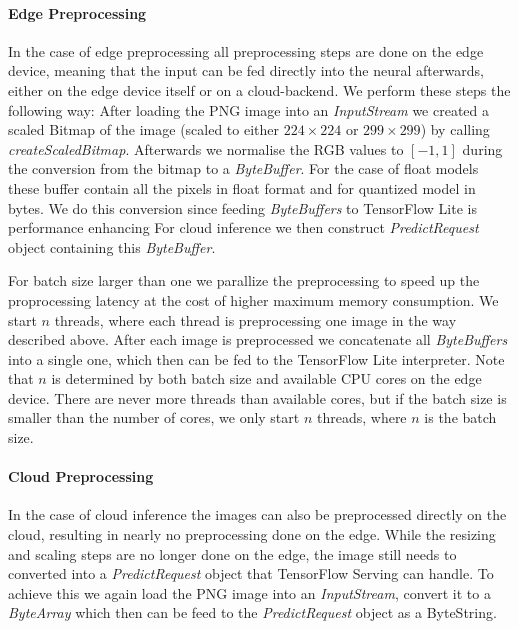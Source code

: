\paragraph{Edge Preprocessing}
In the case of edge preprocessing all preprocessing steps are done on the edge device, meaning that the input can be fed directly into the neural afterwards, either on the edge device itself or on a cloud-backend.
We perform these steps the following way: After loading the PNG image into an \emph{InputStream} we created a scaled Bitmap of the image (scaled to either $224\times224$ or $299\times299$) by calling \emph{createScaledBitmap}. 
Afterwards we normalise the RGB values to $[-1,1]$ during the conversion from the bitmap to a \emph{ByteBuffer}. 
For the case of float models these buffer contain all the pixels in float format and for quantized model in bytes.
We do this conversion since feeding \emph{ByteBuffers} to TensorFlow Lite is performance enhancing %
For cloud inference we then construct \emph{PredictRequest} object containing this \emph{ByteBuffer}.

For batch size larger than one we parallize the preprocessing to speed up the proprocessing latency at the cost of higher maximum memory consumption. We start $n$ threads, where each thread is preprocessing one image in the way described above. After each image is preprocessed we concatenate all \emph{ByteBuffers} into a single one, which then can be fed to the TensorFlow Lite interpreter. Note that $n$ is determined by both batch size and available CPU cores on the edge device. There are never more threads than available cores, but if the batch size is smaller than the number of cores, we only start $n$ threads, where $n$ is the batch size. 

\paragraph{Cloud Preprocessing}

In the case of cloud inference the images can also be preprocessed directly on the cloud, resulting in nearly no preprocessing done on the edge. While the resizing and scaling steps are no longer done on the edge, the image still needs to converted into a \emph{PredictRequest} object that TensorFlow Serving can handle.
To achieve this we again load the PNG image into an \emph{InputStream}, convert it to a \emph{ByteArray} which then can be feed to the \emph{PredictRequest} object as a ByteString. 

